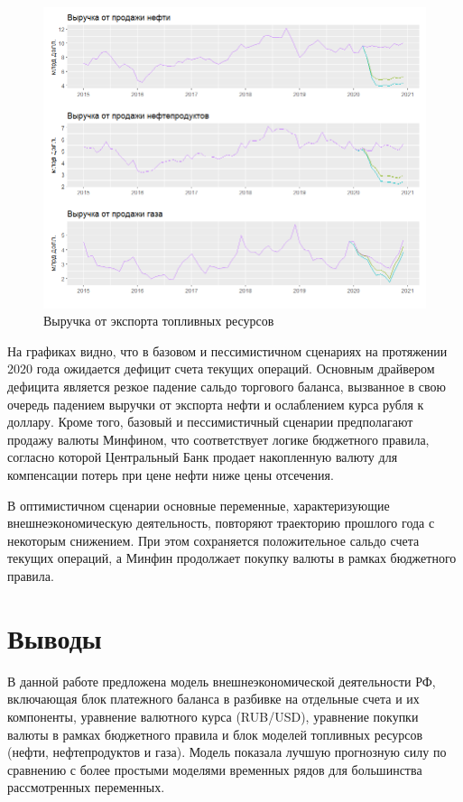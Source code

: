 \documentclass[a4paper, 14pt]{extarticle}
\begin{document}
\begin{figure}[htp]
	\centering
	\includegraphics[width=18cm]{fuels_2015.png}
	\caption{Выручка от экспорта топливных ресурсов}\label{fi:9}
\end{figure}

\newpage

На графиках видно, что в базовом и пессимистичном сценариях на протяжении $2020$ года ожидается дефицит счета текущих операций.
Основным драйвером дефицита является резкое падение сальдо торгового баланса, вызванное в свою очередь падением выручки от экспорта нефти и ослаблением курса рубля к доллару.
Кроме того, базовый и пессимистичный сценарии предполагают продажу валюты Минфином, что соответствует логике бюджетного правила, согласно которой Центральный Банк продает накопленную валюту для компенсации потерь при цене нефти ниже цены отсечения.

В оптимистичном сценарии основные переменные, характеризующие внешнеэкономическую деятельность, повторяют траекторию прошлого года с некоторым снижением. 
При этом сохраняется положительное сальдо счета текущих операций, а Минфин продолжает покупку валюты в рамках бюджетного правила.

\newpage
\section{Выводы}

В данной работе предложена модель внешнеэкономической деятельности РФ, включающая блок платежного баланса в разбивке на отдельные счета и их компоненты, уравнение валютного курса (RUB/USD), уравнение покупки валюты в рамках бюджетного правила и блок моделей топливных ресурсов (нефти, нефтепродуктов и газа).
Модель показала лучшую прогнозную силу по сравнению с более простыми моделями временных рядов для большинства рассмотренных переменных.
\end{document}
